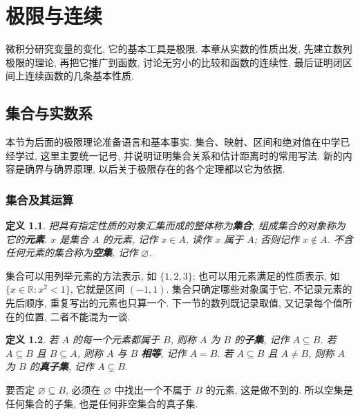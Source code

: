 \documentclass[UTF8,openany]{ctexbook}
\theoremstyle{chinesetextbook}
\newtheorem{definition}{定义}[section]
\begin{document}
\tableofcontents
\clearpage
\chapter{极限与连续}
微积分研究变量的变化, 它的基本工具是极限. 本章从实数的性质出发, 先建立数列极限的理论, 再把它推广到函数, 讨论无穷小的比较和函数的连续性, 最后证明闭区间上连续函数的几条基本性质.
\section{集合与实数系}
本节为后面的极限理论准备语言和基本事实. 集合、映射、区间和绝对值在中学已经学过, 这里主要统一记号, 并说明证明集合关系和估计距离时的常用写法. 新的内容是确界与确界原理, 以后关于极限存在的各个定理都以它为依据.
\subsection{集合及其运算}
\begin{definition}
把具有指定性质的对象汇集而成的整体称为\textbf{集合}, 组成集合的对象称为它的\textbf{元素}. $x$ 是集合 $A$ 的元素, 记作 $x\in A$, 读作 $x$ 属于 $A$; 否则记作 $x\notin A$. 不含任何元素的集合称为\textbf{空集}, 记作 $\varnothing$.
\end{definition}
集合可以用列举元素的方法表示, 如 $\{1,2,3\}$; 也可以用元素满足的性质表示, 如 $\{x\in\mathbb R:x^2<1\}$, 它就是区间 $(-1,1)$. 集合只确定哪些对象属于它, 不记录元素的先后顺序, 重复写出的元素也只算一个. 下一节的数列既记录取值, 又记录每个值所在的位置, 二者不能混为一谈.
\begin{definition}
若 $A$ 的每一个元素都属于 $B$, 则称 $A$ 为 $B$ 的\textbf{子集}, 记作 $A\subseteq B$. 若 $A\subseteq B$ 且 $B\subseteq A$, 则称 $A$ 与 $B$ \textbf{相等}, 记作 $A=B$. 若 $A\subseteq B$ 且 $A\ne B$, 则称 $A$ 为 $B$ 的\textbf{真子集}, 记作 $A\subsetneq B$.
\end{definition}
要否定 $\varnothing\subseteq B$, 必须在 $\varnothing$ 中找出一个不属于 $B$ 的元素, 这是做不到的. 所以空集是任何集合的子集, 也是任何非空集合的真子集.
\end{document}
